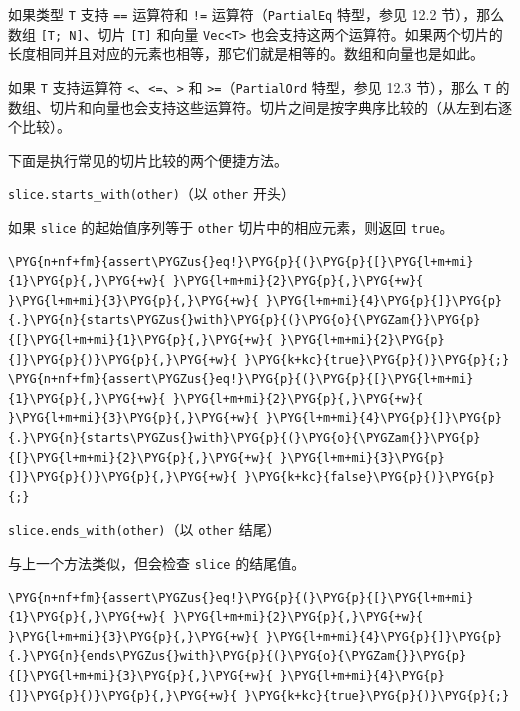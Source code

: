 如果类型 \texttt{T} 支持 \texttt{==} 运算符和 \texttt{!=} 运算符（\texttt{PartialEq} 特型，参见 12.2 节），那么数组 \texttt{[T; N]}、切片 \texttt{[T]} 和向量 \texttt{Vec<T>} 也会支持这两个运算符。如果两个切片的长度相同并且对应的元素也相等，那它们就是相等的。数组和向量也是如此。

如果 \texttt{T} 支持运算符 \texttt{<}、\texttt{<=}、\texttt{>} 和 \texttt{>=}（\texttt{PartialOrd} 特型，参见 12.3 节），那么 \texttt{T} 的数组、切片和向量也会支持这些运算符。切片之间是按字典序比较的（从左到右逐个比较）。

下面是执行常见的切片比较的两个便捷方法。

\begin{myNote}
\texttt{slice.starts\_with(other)}（以 \texttt{other} 开头）
\end{myNote}

如果 \texttt{slice} 的起始值序列等于 \texttt{other} 切片中的相应元素，则返回 \texttt{true}。

\begin{Verbatim}[commandchars=\\\{\},breaklines=true,breakanywhere=true,fontsize=\codefont,xleftmargin=17bp]
\PYG{n+nf+fm}{assert\PYGZus{}eq!}\PYG{p}{(}\PYG{p}{[}\PYG{l+m+mi}{1}\PYG{p}{,}\PYG{+w}{ }\PYG{l+m+mi}{2}\PYG{p}{,}\PYG{+w}{ }\PYG{l+m+mi}{3}\PYG{p}{,}\PYG{+w}{ }\PYG{l+m+mi}{4}\PYG{p}{]}\PYG{p}{.}\PYG{n}{starts\PYGZus{}with}\PYG{p}{(}\PYG{o}{\PYGZam{}}\PYG{p}{[}\PYG{l+m+mi}{1}\PYG{p}{,}\PYG{+w}{ }\PYG{l+m+mi}{2}\PYG{p}{]}\PYG{p}{)}\PYG{p}{,}\PYG{+w}{ }\PYG{k+kc}{true}\PYG{p}{)}\PYG{p}{;}
\PYG{n+nf+fm}{assert\PYGZus{}eq!}\PYG{p}{(}\PYG{p}{[}\PYG{l+m+mi}{1}\PYG{p}{,}\PYG{+w}{ }\PYG{l+m+mi}{2}\PYG{p}{,}\PYG{+w}{ }\PYG{l+m+mi}{3}\PYG{p}{,}\PYG{+w}{ }\PYG{l+m+mi}{4}\PYG{p}{]}\PYG{p}{.}\PYG{n}{starts\PYGZus{}with}\PYG{p}{(}\PYG{o}{\PYGZam{}}\PYG{p}{[}\PYG{l+m+mi}{2}\PYG{p}{,}\PYG{+w}{ }\PYG{l+m+mi}{3}\PYG{p}{]}\PYG{p}{)}\PYG{p}{,}\PYG{+w}{ }\PYG{k+kc}{false}\PYG{p}{)}\PYG{p}{;}
\end{Verbatim}

\begin{myNote}
\texttt{slice.ends\_with(other)}（以 \texttt{other} 结尾）
\end{myNote}

与上一个方法类似，但会检查 \texttt{slice} 的结尾值。

\begin{Verbatim}[commandchars=\\\{\},breaklines=true,breakanywhere=true,fontsize=\codefont,xleftmargin=17bp]
\PYG{n+nf+fm}{assert\PYGZus{}eq!}\PYG{p}{(}\PYG{p}{[}\PYG{l+m+mi}{1}\PYG{p}{,}\PYG{+w}{ }\PYG{l+m+mi}{2}\PYG{p}{,}\PYG{+w}{ }\PYG{l+m+mi}{3}\PYG{p}{,}\PYG{+w}{ }\PYG{l+m+mi}{4}\PYG{p}{]}\PYG{p}{.}\PYG{n}{ends\PYGZus{}with}\PYG{p}{(}\PYG{o}{\PYGZam{}}\PYG{p}{[}\PYG{l+m+mi}{3}\PYG{p}{,}\PYG{+w}{ }\PYG{l+m+mi}{4}\PYG{p}{]}\PYG{p}{)}\PYG{p}{,}\PYG{+w}{ }\PYG{k+kc}{true}\PYG{p}{)}\PYG{p}{;}
\end{Verbatim}

